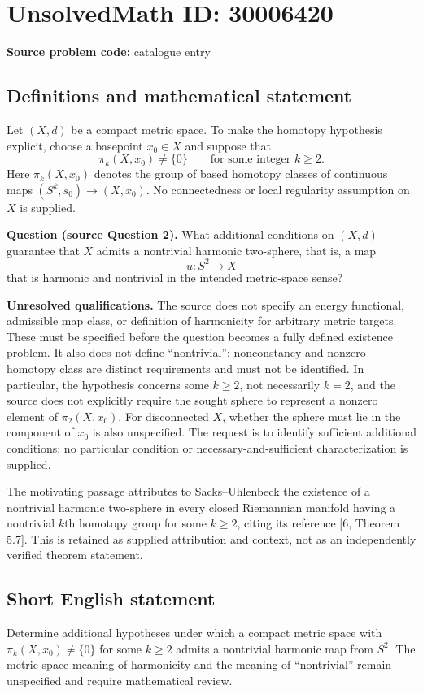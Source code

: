 \documentclass[11pt]{article}
\begin{document}
\section*{UnsolvedMath ID: 30006420}
\textbf{Source problem code:} catalogue entry
\subsection{Definitions and mathematical statement}
Let \((X,d)\) be a compact metric space. To make the homotopy hypothesis explicit, choose a basepoint \(x_0\in X\) and suppose that
\[
\pi_k(X,x_0)\neq\{0\}
\qquad\text{for some integer }k\geq 2.
\]
Here \(\pi_k(X,x_0)\) denotes the group of based homotopy classes of continuous maps \((S^k,s_0)\to(X,x_0)\). No connectedness or local regularity assumption on \(X\) is supplied.

\textbf{Question (source Question 2).} What additional conditions on \((X,d)\) guarantee that \(X\) admits a nontrivial harmonic two-sphere, that is, a map
\[
u:S^2\longrightarrow X
\]
that is harmonic and nontrivial in the intended metric-space sense?

\textbf{Unresolved qualifications.} The source does not specify an energy functional, admissible map class, or definition of harmonicity for arbitrary metric targets. These must be specified before the question becomes a fully defined existence problem. It also does not define ``nontrivial'': nonconstancy and nonzero homotopy class are distinct requirements and must not be identified. In particular, the hypothesis concerns some \(k\geq2\), not necessarily \(k=2\), and the source does not explicitly require the sought sphere to represent a nonzero element of \(\pi_2(X,x_0)\). For disconnected \(X\), whether the sphere must lie in the component of \(x_0\) is also unspecified. The request is to identify sufficient additional conditions; no particular condition or necessary-and-sufficient characterization is supplied.

The motivating passage attributes to Sacks--Uhlenbeck the existence of a nontrivial harmonic two-sphere in every closed Riemannian manifold having a nontrivial \(k\)th homotopy group for some \(k\geq2\), citing its reference [6, Theorem 5.7]. This is retained as supplied attribution and context, not as an independently verified theorem statement.
\subsection{Short English statement}
Determine additional hypotheses under which a compact metric space with \(\pi_k(X,x_0)\neq\{0\}\) for some \(k\geq2\) admits a nontrivial harmonic map from \(S^2\). The metric-space meaning of harmonicity and the meaning of ``nontrivial'' remain unspecified and require mathematical review.
\end{document}
